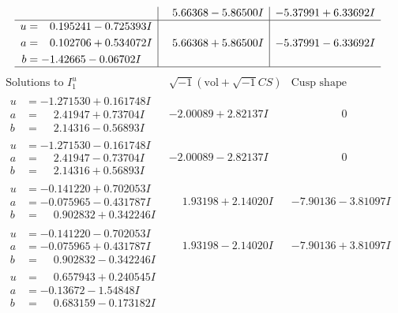 \documentclass[1p]{elsarticle_modified}
\theoremstyle{definition}
\newcommand{\I}{\sqrt{-1}}
\begin{document}
$$\begin{array}{c|c|c}
 & \phantom{-}5.66368 - 5.86500 I & -5.37991 + 6.33692 I \\ \hline\begin{aligned}
u &= \phantom{-}0.195241 - 0.725393 I \\
a &= \phantom{-}0.102706 + 0.534072 I \\
b &= -1.42665 - 0.06702 I\end{aligned}
 & \phantom{-}5.66368 + 5.86500 I & -5.37991 - 6.33692 I\\
 \hline 
 \end{array}$$\newpage$$\begin{array}{c|c|c}  
\text{Solutions to }I^u_{1}& \I (\text{vol} + \sqrt{-1}CS) & \text{Cusp shape}\\
 \hline 
\begin{aligned}
u &= -1.271530 + 0.161748 I \\
a &= \phantom{-}2.41947 + 0.73704 I \\
b &= \phantom{-}2.14316 - 0.56893 I\end{aligned}
 & -2.00089 + 2.82137 I & \phantom{-0.000000 } 0 \\ \hline\begin{aligned}
u &= -1.271530 - 0.161748 I \\
a &= \phantom{-}2.41947 - 0.73704 I \\
b &= \phantom{-}2.14316 + 0.56893 I\end{aligned}
 & -2.00089 - 2.82137 I & \phantom{-0.000000 } 0 \\ \hline\begin{aligned}
u &= -0.141220 + 0.702053 I \\
a &= -0.075965 - 0.431787 I \\
b &= \phantom{-}0.902832 + 0.342246 I\end{aligned}
 & \phantom{-}1.93198 + 2.14020 I & -7.90136 - 3.81097 I \\ \hline\begin{aligned}
u &= -0.141220 - 0.702053 I \\
a &= -0.075965 + 0.431787 I \\
b &= \phantom{-}0.902832 - 0.342246 I\end{aligned}
 & \phantom{-}1.93198 - 2.14020 I & -7.90136 + 3.81097 I \\ \hline\begin{aligned}
u &= \phantom{-}0.657943 + 0.240545 I \\
a &= -0.13672 - 1.54848 I \\
b &= \phantom{-}0.683159 - 0.173182 I\end{aligned}

\end{array}$$
\end{document}
